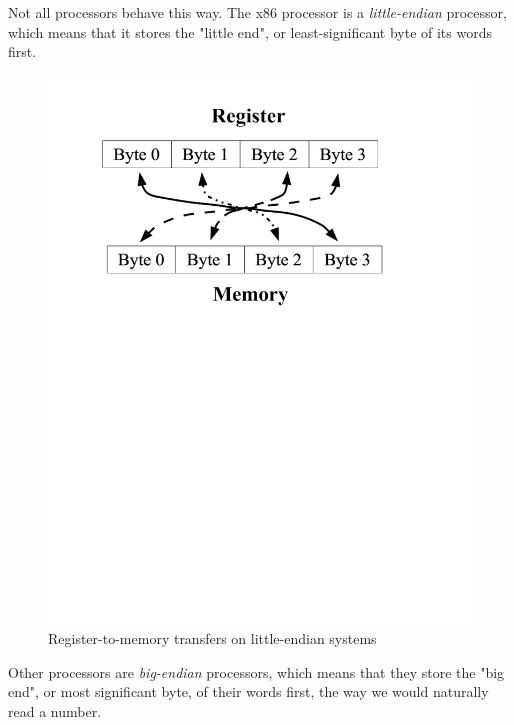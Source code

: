 Not all processors behave this way.  The x86 processor
is a \emph{little-endian} processor, which means that it stores
the "little end", or least-significant byte of its words first.  

\begin{figure}
\caption{Register-to-memory transfers on little-endian systems}
\includegraphics[width=\textwidth]{littleendian.png}
\end{figure}

Other processors are 
\emph{big-endian} processors, which means that they store 
the "big end", or most significant byte, of their words first, the way we would naturally read a number.

